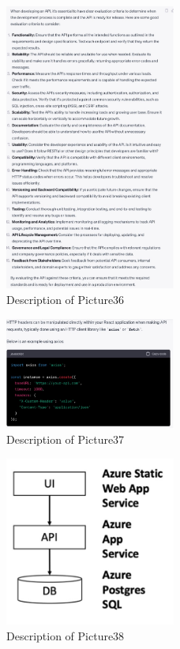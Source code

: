 \documentclass[runningheads]{llncs}
\begin{document}
\begin{figure}[h]
    \centering
    \includegraphics[width=0.5\textwidth]{Pictures/Picture36.jpg}
    \caption{Description of Picture36}
    \label{fig:picture36}
\end{figure}
\begin{figure}[h]
    \centering
    \includegraphics[width=0.5\textwidth]{Pictures/Picture37.jpg}
    \caption{Description of Picture37}
    \label{fig:picture37}
\end{figure}
\begin{figure}[h]
    \centering
    \includegraphics[width=0.5\textwidth]{Pictures/Picture38.jpg}
    \caption{Description of Picture38}
    \label{fig:picture38}
\end{figure}
\end{document}
